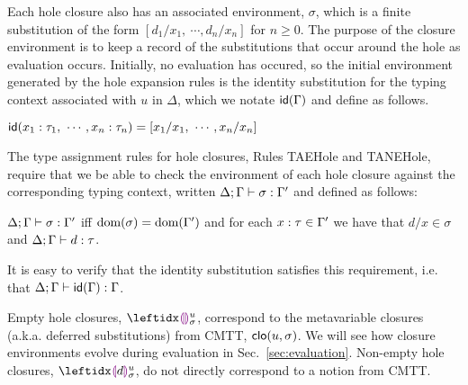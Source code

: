 Each hole closure also has an associated environment, $\sigma$, which is a finite substitution of the form $[d_1/x_1, ~\cdots, d_n/x_n]$ for $n \geq 0$. The purpose of the closure environment is to keep a record of the substitutions that occur around the hole as evaluation occurs. Initially, no evaluation has occured, so the initial environment generated by the hole expansion rules is the identity substitution for the typing context associated with $u$ in $\Delta$, which we notate $\mathsf{id}(\Gamma)$ and define as follows.
\begin{defn} $\mathsf{id}(x_1 : \tau_1, ~\cdots, x_n : \tau_n) = [x_1/x_1, ~\cdots, x_n/x_n]$
\end{defn}
\noindent
The type assignment rules for hole closures, Rules TAEHole and TANEHole, require that we be able to check the environment of each hole closure against the corresponding typing context, written $\Delta; \Gamma \vdash \sigma : \Gamma'$ and defined as follows:
\begin{defn}
$\Delta; \Gamma \vdash \sigma : \Gamma'$ iff $\text{dom}(\sigma) = \text{dom}(\Gamma')$ and for each $x : \tau \in \Gamma'$ we have that $d/x \in \sigma$ and $\Delta; \Gamma \vdash d : \tau$.
\end{defn}
\noindent
It is easy to verify that the identity substitution satisfies this requirement, i.e. that $\Delta; \Gamma \vdash \mathsf{id}(\Gamma) : \Gamma$. 

Empty hole closures, $\dehole{u}{\sigma}{}$,  correspond to the metavariable closures (a.k.a. deferred substitutions) from CMTT, $\mathsf{clo}(u, \sigma)$. We will see how closure environments evolve during evaluation in Sec.~\ref{sec:evaluation}. Non-empty hole closures, $\dhole{d}{u}{\sigma}{}$, do not directly correspond to a notion from CMTT.

